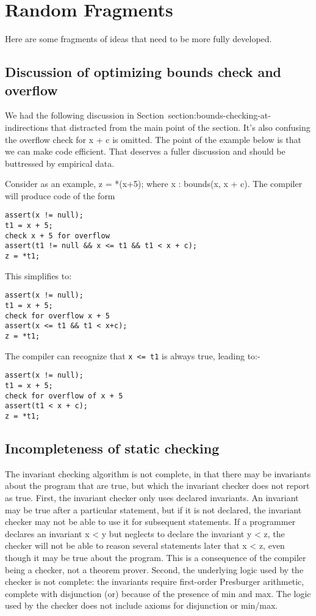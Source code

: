 

\chapter{Random Fragments}

Here are some fragments of ideas that need to be more fully developed.

\section{Discussion of optimizing bounds check and overflow}

We had the following discussion in Section~{section:bounds-checking-at-indirections}
that distracted from the
main point of the section. It's also confusing the overflow check for x
+ c is omitted. The point of the example below is that we can make code
efficient. That deserves a fuller discussion and should be buttressed by
empirical data.

Consider as an example, z = *(x+5); where x : bounds(x, x + c). The
compiler will produce code of the form

\begin{lstlisting}
assert(x != null);
t1 = x + 5;
check x + 5 for overflow
assert(t1 != null && x <= t1 && t1 < x + c);
z = *t1;
\end{lstlisting}

This simplifies to:

\begin{lstlisting}
assert(x != null);
t1 = x + 5;
check for overflow x + 5
assert(x <= t1 && t1 < x+c);
z = *t1;
\end{lstlisting}

The compiler can recognize that \texttt{x <= t1} is always true,
leading to:-

\begin{lstlisting}
assert(x != null);
t1 = x + 5;
check for overflow of x + 5
assert(t1 < x + c);
z = *t1;
\end{lstlisting}

\section{Incompleteness of static checking}

The invariant checking algorithm is not complete, in that there may be
invariants about the program that are true, but which the invariant
checker does not report as true. First, the invariant checker only uses
declared invariants. An invariant may be true after a particular
statement, but if it is not declared, the invariant checker may not be
able to use it for subsequent statements. If a programmer declares an
invariant x \textless{} y but neglects to declare the invariant y
\textless{} z, the checker will not be able to reason several statements
later that x \textless{} z, even though it may be true about the
program. This is a consequence of the compiler being a checker, not a
theorem prover. Second, the underlying logic used by the checker is not
complete: the invariants require first-order Presburger arithmetic,
complete with disjunction (or) because of the presence of min and max.
The logic used by the checker does not include axioms for disjunction or
min/max.


